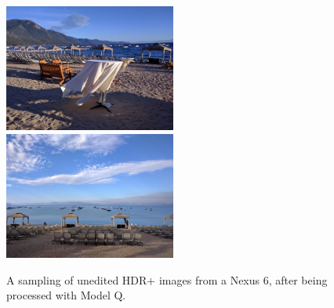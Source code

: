 \documentclass[10pt,twocolumn,letterpaper]{article}
\newcommand{\threewidth}{2.22in}
\begin{document}
\begin{figure}[!]
  \includegraphics[width=\threewidth]{figures/images/IMG_20160830_185610.jpg}
  \includegraphics[width=\threewidth]{figures/images/IMG_20160830_081944.jpg}
  \caption{
    A sampling of unedited HDR+\cite{Hasinoff2016} images from a Nexus 6, after
    being processed with Model Q.
    \label{fig:realimages}
  }
\end{figure}


{\small


}
\end{document}
